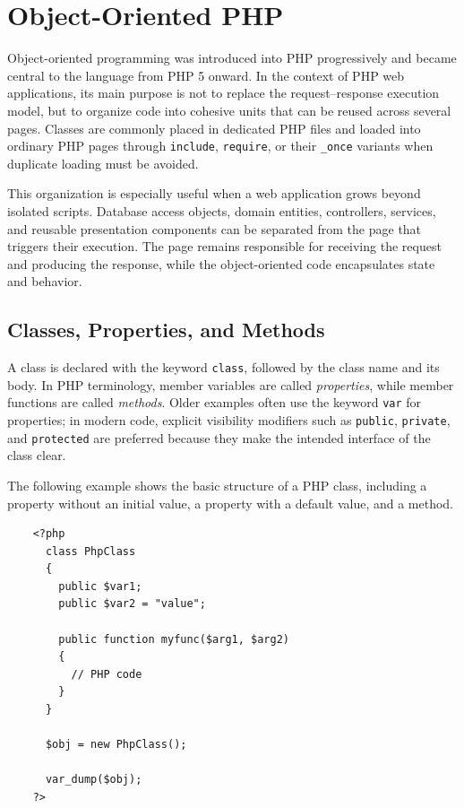\documentclass{scrbook}
\begin{document}
	\chapter{Object-Oriented PHP}
	
	Object-oriented programming was introduced into PHP progressively and became central to the language from PHP 5 onward. In the context of PHP web applications, its main purpose is not to replace the request--response execution model, but to organize code into cohesive units that can be reused across several pages. Classes are commonly placed in dedicated PHP files and loaded into ordinary PHP pages through \texttt{include}, \texttt{require}, or their \texttt{\_once} variants when duplicate loading must be avoided.
	
	This organization is especially useful when a web application grows beyond isolated scripts. Database access objects, domain entities, controllers, services, and reusable presentation components can be separated from the page that triggers their execution. The page remains responsible for receiving the request and producing the response, while the object-oriented code encapsulates state and behavior.
	
	\section{Classes, Properties, and Methods}
	
	A class is declared with the keyword \texttt{class}, followed by the class name and its body. In PHP terminology, member variables are called \emph{properties}, while member functions are called \emph{methods}. Older examples often use the keyword \texttt{var} for properties; in modern code, explicit visibility modifiers such as \texttt{public}, \texttt{private}, and \texttt{protected} are preferred because they make the intended interface of the class clear.
	
	The following example shows the basic structure of a PHP class, including a property without an initial value, a property with a default value, and a method.
	
	\begin{lstlisting}
	<?php
	  class PhpClass
	  {
		public $var1;
		public $var2 = "value";
	
		public function myfunc($arg1, $arg2)
		{
		  // PHP code
		}
	  }
		
	  $obj = new PhpClass();
	
	  var_dump($obj);
	?>
	\end{lstlisting}
	
\end{document}
